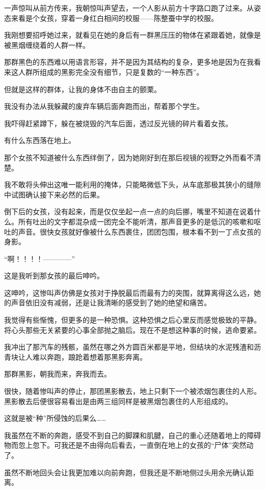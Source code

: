 一声惊叫从前方传来，我朝惊叫声望去，一个人影从前方十字路口跑了过来。从姿态来看是个女孩，穿着一身红白相间的校服——陈整蚕中学的校服。

我刚想要招呼她过来，就看见在她的身后有一群黑压压的物体在紧跟着她，就像是被黑烟缠绕着的人群一样。

那群黑色的东西难以用语言形容，并不是因为其结构的复杂，更多地是因为在我看来这人群所组成的黑影完全没有细节，只是复数的“一种东西”。

但就是这样的群体，让我的身体不由自主的颤栗。

我没有办法从我躲藏的废弃车辆后面奔跑而出，帮着那个学生。

我吓得赶紧蹲下，躲在被烧毁的汽车后面，透过反光镜的碎片看着女孩。

有什么东西落在地上。

那个女孩不知道被什么东西绊倒了，因为她刚好到在那后视镜的视野之外而看不清楚。

我不敢将头伸出这唯一能利用的掩体，只能略微低下头，从车底那极其狭小的缝隙中试图确认接下来必然的后果。

倒下后的女孩，没有起来，而是仅仅坐起一点一点的向后挪，嘴里不知道在说着什么。所有吐出的文字都混杂成一团完全不能听清，那声音更多的是低沉的咳嗽和呕吐的声音。很快女孩就好像被什么东西裹住，团团包围，根本看不到一丁点女孩的身影。

“啊！！！！————”

这是我听到那女孩的最后呻吟。

这呻吟，这惨叫声仿佛是女孩对于挣脱最后而最有力的突围，就算离得这么远，她的声音依旧没有减弱，还是让我清晰的感受到了她的绝望和痛苦。

我觉得有些惭愧，但更多的是一种恐惧。这种恐惧之后心里反而感觉极致的平静。将心头那些无关紧要的心事全部抛之脑后。现在不是想这种事的时候，逃命要紧。

我冲出了那汽车的残骸，虽然在哪之外方圆百米都是平地，但结块的水泥残渣和沥青块让人难以奔跑，踉跄着想着那黑影奔离。

那群黑影，朝我而来，奔我而去。

很快，随着惨叫声的停止，那团黑影散去，地上只剩下一个被浓烟包裹住的人形。黑影散去后便很容易看出是由两三组同样是被黑烟包裹住的人形组成的。

这就是被“种”所侵蚀的后果么……

我虽然在不断的奔跑，感受不到自己的脚踝和肌腱，自己的重心还随着地上的障碍物而忽上忽下。可我还是不由得向后看去，一直倒在地上的女孩的“尸体”突然动了。

虽然不断地回头会让我更加难以向前奔跑，但我还是不断地侧过头用余光确认距离。

